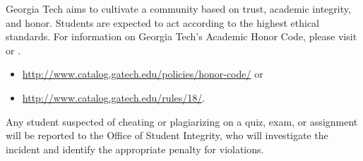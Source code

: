Georgia Tech aims to cultivate a community based on trust, academic integrity, and honor. Students are expected to act according to the highest ethical standards.  For information on Georgia Tech's Academic Honor Code, please visit  or .

        \begin{itemize}
            \item \url{http://www.catalog.gatech.edu/policies/honor-code/} or
            \item \url{http://www.catalog.gatech.edu/rules/18/}.
        \end{itemize}
        
Any student suspected of cheating or plagiarizing on a quiz, exam, or assignment will be reported to the Office of Student Integrity, who will investigate the incident and identify the appropriate penalty for violations.
